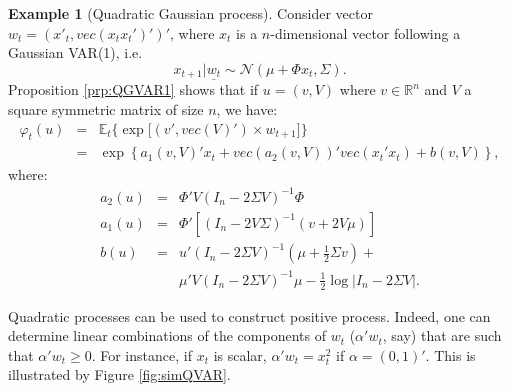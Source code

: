 \documentclass[
  12pt,
]{book}
\theoremstyle{definition}
\theoremstyle{definition}
\newtheorem{example}{Example}[chapter]
\theoremstyle{definition}
\theoremstyle{definition}
\theoremstyle{remark}
\begin{document}
\begin{example}[Quadratic Gaussian process]
\protect\hypertarget{exm:QGVAR1}{}\label{exm:QGVAR1}Consider vector \(w_t = (x'_t,vec(x_t x_t')')'\), where \(x_t\) is a \(n\)-dimensional vector following a Gaussian VAR(1), i.e.
\[
x_{t+1}|\underline{w_t} \sim \mathcal{N}(\mu+\Phi x_t, \Sigma).
\]
Proposition \ref{prp:QGVAR1} shows that if \(u = (v,V)\) where \(v \in \mathbb{R}^n\) and \(V\) a square symmetric matrix of size \(n\), we have:
\begin{eqnarray*}
\varphi_t(u) &=& \mathbb{E}_t\big\{\exp\big[(v',vec(V)')\times w_{t+1}\big]\big\} \\
& =& \exp \left\{a_1(v,V)'x_t +vec(a_2(v,V))' vec(x_t'x_t) + b(v,V) \right\},
\end{eqnarray*}
where:
\begin{eqnarray*}
a_2(u) & = & \Phi'V (I_n - 2\Sigma V)^{-1} \Phi \nonumber \\
a_1(u) & = & \Phi'\left[(I_n-2V\Sigma)^{-1}(v+2V\mu)\right] \nonumber \\
b(u) & = & u'(I_n - 2 \Sigma V)^{-1}\left(\mu + \frac{1}{2} \Sigma v\right) +\\
&& \mu'V(I_n - 2 \Sigma V)^{-1}\mu - \frac{1}{2}\log\big|I_n - 2\Sigma V\big|.\label{eq:laplaceZ}
\end{eqnarray*}

Quadratic processes can be used to construct positive process. Indeed, one can determine linear combinations of the components of \(w_t\) (\(\alpha'w_t\), say) that are such that \(\alpha'w_t \ge 0\). For instance, if \(x_t\) is scalar, \(\alpha'w_t = x_t^2\) if \(\alpha = (0,1)'\). This is illustrated by Figure \ref{fig:simQVAR}.


\end{example}
\end{document}

